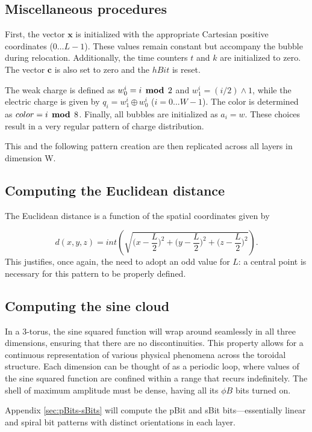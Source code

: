 \documentclass[12pt,english]{article}
\begin{document}
\subsection{Miscellaneous procedures}

First, the vector $\boldsymbol{x}$ is initialized with the appropriate Cartesian positive coordinates ($0 \dots L-1$). These values remain constant but accompany the bubble during relocation. Additionally, the time counters $t$ and $k$ are initialized to zero. The vector $\mathbf{c}$ is also set to zero and the $hBit$ is reset.
 
The weak charge is defined as $w_{0}^{i} = i \,\boldsymbol{\bmod}\, 2$ and $w_{1}^{i} = (i / 2) \land 1$, while the electric charge is given by $q_{i} = w_{1}^{i} \,\boldsymbol{\oplus}\, w_{0}^{i}$ ($i=0...W-1$). The color is determined as $color = i \,\boldsymbol{\bmod}\, 8$. Finally, all bubbles are initialized as $a_{i} = w$. These choices result in a very regular pattern of charge distribution.

This and the following pattern creation are then replicated across all layers in dimension W.

\subsection{Computing the Euclidean distance}
The Euclidean distance is a function of the spatial coordinates given by

\[
d(x,y,z)=int\left(\sqrt{\bigg(x-\frac{L}{2}\bigg)^{2}+\bigg(y-\frac{L}{2}\bigg)^{2}+\bigg(z-\frac{L}{2}\bigg)^{2}}\right).
\]
This justifies, once again, the need to adopt an odd value for $L$: a central point is necessary for this pattern to be properly defined. 

\subsection{Computing the sine cloud} \label{subsec:sine-cloud}
In a 3-torus, the sine squared function will wrap around seamlessly in all three dimensions, ensuring that there are no discontinuities. This property allows for a continuous representation of various physical phenomena across the toroidal structure. Each dimension can be thought of as a periodic loop, where values of the sine squared function are confined within a range that recurs indefinitely. The shell of maximum amplitude must be dense, having all its $\phi B$ bits turned on.

Appendix \ref{sec:pBits-sBits} will compute the pBit and sBit bits—essentially linear and spiral bit patterns with distinct orientations in each layer.
\end{document}
